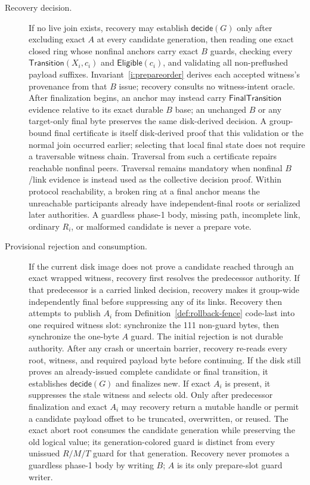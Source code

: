 \documentclass[10pt,twocolumn]{article}
\theoremstyle{remark}
\begin{document}
\begin{description}
  \item[Recovery decision.] If no live join exists, recovery may establish
  $\mathsf{decide}(G)$ only after excluding exact $A$ at every candidate generation, then reading
  one exact closed ring whose nonfinal anchors carry exact $B$ guards, checking every
  $\mathsf{Transition}(X_i,c_i)$ and $\mathsf{Eligible}(c_i)$, and validating all non-preflushed
  payload suffixes. Invariant~\ref{i:prepareorder} derives each accepted witness's provenance from
  that $B$ issue; recovery consults no witness-intent oracle. After finalization begins, an anchor
  may instead carry $\mathsf{FinalTransition}$ evidence relative to its exact durable $B$ base; an
  unchanged $B$ or any target-only final byte preserves the same disk-derived decision. A
  group-bound final certificate is itself disk-derived proof that this validation or the normal
  join occurred earlier; selecting that local final state does not require a traversable witness
  chain. Traversal from such a certificate repairs reachable nonfinal peers. Traversal remains
  mandatory when nonfinal $B$/link evidence is instead used as the collective decision proof.
  Within protocol reachability, a broken ring at a final anchor means the unreachable participants
  already have independent-final roots or serialized later authorities. A guardless phase-1 body,
  missing path, incomplete link, ordinary $R_i$, or malformed candidate is never a prepare vote.

  \item[Provisional rejection and consumption.] If the current disk image does not prove a
  candidate reached through an exact wrapped witness, recovery first resolves the predecessor
  authority. If that predecessor is a carried linked decision, recovery makes it group-wide
  independently final before suppressing any of its links. Recovery then attempts to publish $A_i$
  from Definition~\ref{def:rollback-fence} code-last into one required witness slot: synchronize the
  111 non-guard bytes, then synchronize the one-byte $A$ guard. The initial rejection is not durable
  authority. After any crash or uncertain barrier, recovery re-reads every root, witness, and
  required payload byte before continuing. If the disk still proves an already-issued complete
  candidate or final transition, it establishes $\mathsf{decide}(G)$ and finalizes new. If exact $A_i$ is
  present, it suppresses the stale witness and selects old. Only after predecessor finalization and
  exact $A_i$ may recovery return a mutable handle or permit a candidate payload offset to be
  truncated, overwritten, or reused. The exact abort root consumes the candidate generation while
  preserving the old logical value; its generation-colored guard is distinct from every unissued
  $R/M/T$ guard for that generation. Recovery never promotes a guardless phase-1 body by writing
  $B$; $A$ is its only prepare-slot guard writer.


\end{description}
\end{document}
